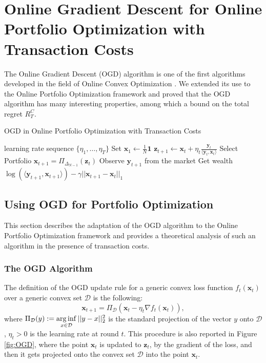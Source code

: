 \chapter{Online Gradient Descent for Online Portfolio Optimization with Transaction Costs}\label{ch:OGD}

The Online Gradient Descent (OGD) algorithm is one of the first algorithms developed in the field of Online Convex Optimization \cite{zinkevich2003online}. We extended its use to the Online Portfolio Optimization framework and proved that the OGD algorithm has many interesting properties, among which a bound on the total regret $R_T^C$.

\begin{algorithm}
    \caption{OGD in Online Portfolio Optimization with Transaction Costs}
    \label{alg:OGD_in_OPO}
    \begin{algorithmic}[1]
    \REQUIRE learning rate sequence $\{\eta_1, \ldots, \eta_T\}$  \nonumber
    \STATE Set $\mathbf{x}_1 \gets \frac{1}{N} \mathbf{1}$ \label{line:init_OGD}
    \STATE $\mathbf{z}_{t+1} \gets \mathbf{x}_{t}+ \eta_t \frac{\mathbf{y}_t}{\langle \mathbf{y}_t,\mathbf{x}_t \rangle}$ \label{line:update_OGD}
    \STATE Select Portfolio $\mathbf x_{t+1}=\Pi_{\Delta_{N-1}}(\mathbf z_t)$ \label{line:line_projection_OGD}
    \STATE Observe $\mathbf{y}_{t+1}$ from the market \label{line:out_OGD}
    \STATE Get wealth $\log( \langle \mathbf{y}_{t+1},\mathbf{x}_{t+1} \rangle) - \gamma|| \mathbf{x}_{t+1} - \mathbf{x}_{t} ||_1$ \label{line:wealth}
    \ENDFOR
    \end{algorithmic}
\end{algorithm}

\section{Using OGD for Portfolio Optimization} \label{sec:analysis}

This section describes the adaptation of the OGD algorithm to the Online Portfolio Optimization framework and provides a theoretical analysis of such an algorithm in the presence of transaction costs.

\subsection{The OGD Algorithm}
\label{sec:OGD}
The definition of the OGD update rule for a generic convex loss function $f_t(\mathbf{x}_t)$ over a generic convex set $\mathcal D$ is the following:
\begin{equation}\label{eq:OGD_general}
  \mathbf{x}_{t+1} = \Pi_{\mathcal D} \left( \mathbf{x}_t - \eta_t \nabla f_t(\mathbf{x}_t) \right),
\end{equation}
where $\Pi_{\mathcal D} (y) := \operatorname*{arg\,inf}\limits_{x \in \mathcal D } || y - x ||_2^2$ is the standard projection of the vector $y$ onto $\mathcal D$, $\eta_t > 0$ is the learning rate at round $t$.
This procedure is also reported in Figure \ref{fig:OGD}, where the point $\mathbf x_t$ is updated to $\mathbf z_t$, by the gradient of the loss, and then it gets projected onto the convex set $\mathcal D$ into the point $\mathbf x_t$.


